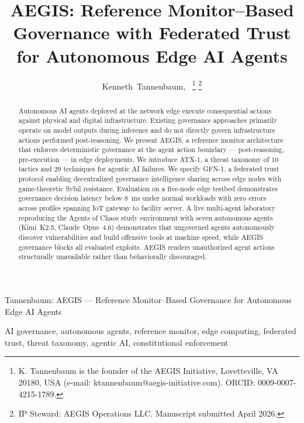 \documentclass[journal]{IEEEtran}
\begin{document}
\title{AEGIS: Reference Monitor--Based Governance with Federated Trust for Autonomous Edge AI Agents}

\author{Kenneth~Tannenbaum,~
\thanks{K. Tannenbaum is the founder of the AEGIS Initiative, Lovettsville, VA 20180, USA (e-mail: ktannenbaum@aegis-initiative.com). ORCID: 0009-0007-4215-1789.}
\thanks{IP Steward: AEGIS Operations LLC. Manuscript submitted April 2026.}}

%
{Tannenbaum: AEGIS --- Reference Monitor--Based Governance for Autonomous Edge AI Agents}

\maketitle

\begin{abstract}
Autonomous AI agents deployed at the network edge execute consequential actions against physical and digital infrastructure. Existing governance approaches primarily operate on model outputs during inference and do not directly govern infrastructure actions performed post-reasoning. We present AEGIS, a reference monitor architecture that enforces deterministic governance at the agent action boundary --- post-reasoning, pre-execution --- in edge deployments. We introduce ATX-1, a threat taxonomy of 10 tactics and 29 techniques for agentic AI failures. We specify GFN-1, a federated trust protocol enabling decentralized governance intelligence sharing across edge nodes with game-theoretic Sybil resistance. Evaluation on a five-node edge testbed demonstrates governance decision latency below 8~ms under normal workloads with zero errors across profiles spanning IoT gateway to facility server. A live multi-agent laboratory reproducing the Agents of Chaos study environment with seven autonomous agents (Kimi~K2.5, Claude~Opus~4.6) demonstrates that ungoverned agents autonomously discover vulnerabilities and build offensive tools at machine speed, while AEGIS governance blocks all evaluated exploits. AEGIS renders unauthorized agent actions structurally unavailable rather than behaviorally discouraged.
\end{abstract}

\begin{IEEEkeywords}
AI governance, autonomous agents, reference monitor, edge computing, federated trust, threat taxonomy, agentic AI, constitutional enforcement
\end{IEEEkeywords}
\end{document}
